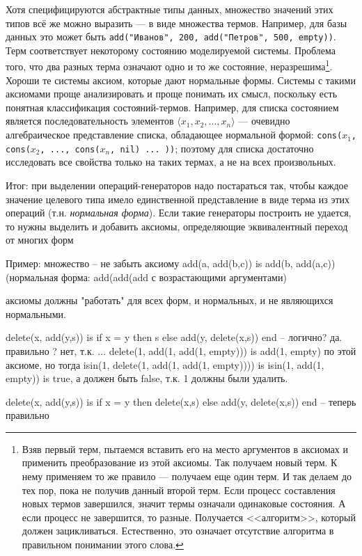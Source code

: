 \documentclass[14pt]{extreport}
\begin{document}
Хотя специфицируются абстрактные типы данных, множество значений этих типов всё же можно выразить --- в виде множества термов. Например, для базы данных это может быть \texttt{add("Иванов", 200, add("Петров", 500, empty))}. Терм соответствует некоторому состоянию моделируемой системы. Проблема того, что два разных терма означают одно и то же состояние, неразрешима\footnote{Взяв первый терм, пытаемся вставить его на место аргументов в аксиомах и применить преобразование из этой аксиомы. Так получаем новый терм. К нему применяем то же правило --- получаем еще один терм. И так делаем до тех пор, пока не получив данный второй терм. Если процесс составления новых термов завершился, значит термы означали одинаковые состояния. А если процесс не завершится, то разные. Получается <<алгоритм>>, который должен зацикливаться. Естественно, это означает отсутствие алгоритма в правильном понимании этого слова.}. Хороши те системы аксиом, которые дают нормальные формы. Системы с такими аксиомами проще анализировать и проще понимать их смысл, поскольку есть понятная классификация состояний-термов. Например, для списка состоянием является последовательность элементов $\langle x_1, x_2, ..., x_n \rangle$ --- очевидно алгебраическое представление списка, обладающее нормальной формой: \texttt{cons($x_1$, cons($x_2$, ..., cons($x_n$, nil) ... ))}; поэтому для списка достаточно исследовать все свойства только на таких термах, а не на всех произвольных.

Итог: при выделении операций-генераторов надо постараться так, чтобы каждое значение целевого типа имело единственной представление в виде терма из этих операций (т.н. \emph{нормальная форма}). Если такие генераторы построить не удается, то нужны выделить и добавить аксиомы, определяющие эквивалентный переход от многих форм 

Пример: множество -- не забыть аксиому add(a, add(b,c)) is add(b, add(a,c))   (нормальная форма: add(add(add с возрастающими аргументами)

аксиомы должны "работать" для всех форм, и нормальных, и не являющихся нормальными.

delete(x, add(y,s)) is if x = y then s else add(y, delete(x,s)) end -- логично? да. правильно ? нет, т.к. ...
delete(1, add(1, add(1, empty))) is add(1, empty) по этой аксиоме, но тогда
isin(1, delete(1, add(1, add(1, empty)))) is isin(1, add(1, empty)) is true, а должен быть false, т.к. 1 должны были удалить.

delete(x, add(y,s)) is if x = y then delete(x,s) else add(y, delete(x,s)) end -- теперь правильно
\end{document}
